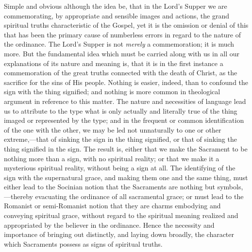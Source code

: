 \documentclass[english,]{book}
\begin{document}
Simple and obvious although the idea be, that in the Lord's Supper we are commemorating, by appropriate and sensible images and actions, the grand spiritual truths characteristic of the Gospel, yet it is the omission or denial of this that has been the primary cause of numberless errors in regard to the nature of the ordinance. The Lord's Supper is not \emph{merely} a commemoration; it is much more. But the fundamental idea which must be carried along with us in all our explanations of its nature and meaning is, that it is in the first instance a commemoration of the great truths connected with the death of Christ, as the sacrifice for the sins of His people. Nothing is easier, indeed, than to confound the sign with the thing signified; and nothing is more common in theological argument in reference to this matter. The nature and necessities of language lead us to attribute to the type what is only actually and literally true of the thing imaged or represented by the type; and in the frequent or common identification of the one with the other, we may be led not unnaturally to one or other extreme,---that of sinking the sign in the thing signified, or that of sinking the thing signified in the sign. The result is, either that we make the Sacrament to be nothing more than a sign, with no spiritual reality; or that we make it a mysterious spiritual reality, without being a sign at all. The identifying of the sign with the supernatural grace, and making them one and the same thing, must either lead to the Socinian notion that the Sacraments are nothing but symbols,---thereby evacuating the ordinance of all sacramental grace; or must lead to the Romanist or semi-Romanist notion that they are charms embodying and conveying spiritual grace, without regard to the spiritual meaning realized and appropriated by the believer in the ordinance. Hence the necessity and importance of bringing out distinctly, and laying down broadly, the character which Sacraments possess as signs of spiritual truths.
\end{document}
